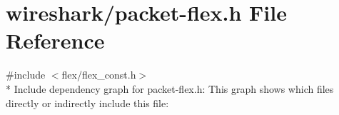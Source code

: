\hypertarget{packet-flex_8h}{}\section{wireshark/packet-\/flex.h File Reference}
\label{packet-flex_8h}
{\ttfamily \#include $<$flex/flex\+\_\+const.\+h$>$}\\*
Include dependency graph for packet-\/flex.h\+:
This graph shows which files directly or indirectly include this file\+:
